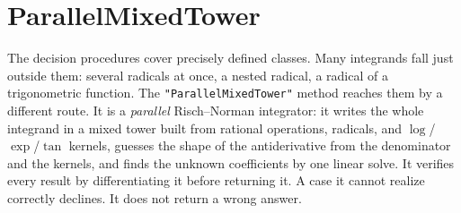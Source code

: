 \section{ParallelMixedTower}
\label{sec:int-pmt}

The decision procedures cover precisely defined classes. Many integrands fall just
outside them: several radicals at once, a nested radical, a radical of a
trigonometric function. The \texttt{"ParallelMixedTower"} method reaches them by a
different route. It is a \emph{parallel} Risch--Norman integrator: it writes the
whole integrand in a mixed tower built from rational operations, radicals, and
\(\log\)/\(\exp\)/\(\tan\) kernels, guesses the shape of the antiderivative from
the denominator and the kernels, and finds the unknown coefficients by one linear
solve. It verifies every result by differentiating it before returning it. A case
it cannot realize correctly declines. It does not return a wrong answer.

\begin{codepairs}
\end{codepairs}

